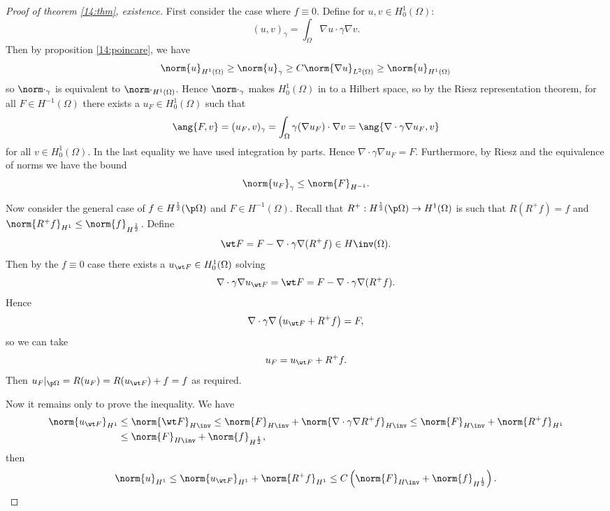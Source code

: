 \begin{proof}[Proof of theorem \ref{14:thm}, existence]
  First consider the case where $f\equiv0$.
  Define for $u,v \in H_0^1(\Omega)$:
  \[ (u,v)_\gamma = \int_\Omega \nabla u \cdot\gamma \nabla v. \]
  Then by proposition \ref{14:poincare}, we have
  \[ \norm{u}_{H^1(\Omega)} \geq \norm{u}_\gamma \geq C\norm{\nabla u}_{L^2(\Omega)} \geq \norm{u}_{H^1(\Omega)} \]
  so $\norm\cdot_\gamma$ is equivalent to $\norm\cdot_{H^1(\Omega)}$.
  Hence $\norm\cdot_\gamma$ makes $H_0^1(\Omega)$ in to a Hilbert space, so by the Riesz representation theorem, for all $F\in H^{-1}(\Omega)$ there exists a $u_F\in H_0^1(\Omega)$ such that
  \[ \ang{F,v} = (u_F,v)_\gamma = \int_\Omega \gamma(\nabla u_F) \cdot \nabla v = \ang{\nabla\cdot \gamma\nabla u_F,v} \]
  for all $v \in H_0^1(\Omega)$.
  In the last equality we have used integration by parts.
  Hence $\nabla\cdot\gamma\nabla u_F=F$.
  Furthermore, by Riesz and the equivalence of norms we have the bound
  \[ \norm{u_F}_\gamma \leq \norm{F}_{H^{-1}}. \]

  Now consider the general case of $f\in H^\frac12(\p\Omega)$ and $F\in H^{-1}(\Omega)$.
  Recall that $R^+: H^\frac12(\p\Omega) \to H^1(\Omega)$ is such that $R(R^+f)=f$ and $\norm{R^+f}_{H^1} \leq \norm{f}_{H^\frac12}$.
  Define
  \[ \wt F = F - \nabla\cdot\gamma\nabla(R^+f) \in H\inv(\Omega). \]
  Then by the $f\equiv0$ case there exists a $u_{\wt F} \in H_0^1(\Omega)$ solving
  \[ \nabla\cdot\gamma\nabla u_{\wt F} = \wt F = F-\nabla\cdot\gamma\nabla(R^+f). \]
  Hence
  \[ \nabla\cdot\gamma\nabla\left( u_{\wt F}+R^+f \right) = F, \]
  so we can take
  \[ u_F = u_{\wt F}+R^+f. \]
  Then $u_F|_{\p\Omega} = R(u_F) = R(u_{\wt F}) + f = f$ as required.

  Now it remains only to prove the inequality.
  We have
  \begin{align*}
    \norm{u_{\wt F}}_{H^1} &\leq \norm{\wt F}_{H\inv} \leq \norm{F}_{H\inv} + \norm{\nabla\cdot\gamma\nabla R^+f}_{H\inv} \leq \norm{F}_{H\inv} + \norm{R^+f}_{H^1} \\
    &\leq \norm{F}_{H\inv} + \norm{f}_{H^\frac12},
  \end{align*}
  then
  \[ \norm{u}_{H^1} \leq \norm{u_{\wt F}}_{H^1} + \norm{R^+f}_{H^1} \leq C\left( \norm{F}_{H\inv} + \norm{f}_{H^\frac12} \right). \qedhere \]
\end{proof}

